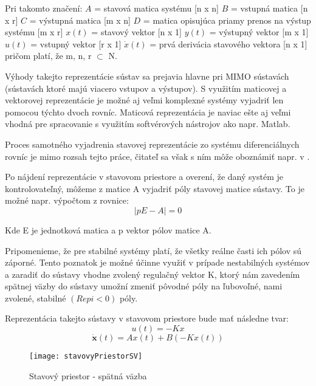Pri takomto značení:\newline
$A$ = stavová matica systému [n x n]\newline
$B$ = vstupná matica [n x r]\newline
$C$ = výstupná matica [m x n]\newline
$D$ = matica opisujúca priamy prenos na výstup systému [m x r]\newline
$x(t)$ = stavový vektor [n x 1]\newline
$y(t)$ = výstupný vektor [m x 1]\newline
$u(t)$ = vstupný vektor [r x 1]\newline
$\dot{x}(t)$ = prvá derivácia stavového vektora [n x 1]
pričom platí, že m, n, r $\subset$ N. 

Výhody takejto reprezentácie sústav sa prejavia hlavne pri MIMO sústavách (sústavách ktoré majú viacero vstupov a výstupov). S využitím maticovej a vektorovej reprezentácie je možné aj veľmi komplexné systémy vyjadriť len pomocou týchto dvoch rovníc. Maticová reprezentácia je naviac ešte aj veľmi vhodná pre spracovanie s využitím softvérových nástrojov ako napr. Matlab.

Proces samotného vyjadrenia stavovej reprezentácie zo systému diferenciálnych rovníc je mimo rozsah tejto práce, čitateľ sa však s ním môže oboznámiť napr. v \cite{ContSys}.

Po nájdení reprezentácie v stavovom priestore a overení, že daný systém je kontrolovateľný, môžeme z matice A vyjadriť póly stavovej matice sústavy. To je možné napr. výpočtom z rovnice:
\begin{equation}
\mid pE - A \mid = 0 
\end{equation}

Kde E je jednotková matica a p vektor pólov matice A.

Pripomenieme, že pre stabilné systémy platí, že všetky reálne časti ich pólov sú záporné. Tento poznatok je možné účinne využiť v prípade nestabilných systémov a zaradiť do sústavy vhodne zvolený regulačný vektor K, ktorý nám zavedením spätnej väzby do sústavy umožní zmeniť pôvodné póly na ľubovoľné, nami zvolené, stabilné $(Re{pi}<0)$ póly. 

Reprezentácia takejto sústavy v stavovom priestore bude mať následne tvar:
\begin{equation}
u( t ) = -Kx
\label{eq:ut}
\end{equation}
\begin{equation}
\dot{\textbf{x}}(t) = Ax(t) + B(-Kx(t))
\label{eq:xDot}
\end{equation}
\begin{figure}
\centering
\texttt{[image: stavovyPriestorSV]}
\caption{Stavový priestor - spätná väzba}
\label{fig:stavovyPriestorSV}
\end{figure}

